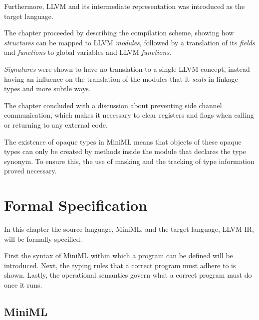\documentclass[10pt,a4paper]{report}
\begin{document}
Furthermore, LLVM and its intermediate representation was introduced as the target language.

The chapter proceeded by describing the compilation scheme, showing how \emph{structures} can be mapped to LLVM \emph{modules}, followed by a translation of its \emph{fields} and \emph{functions} to global variables and LLVM \emph{functions}.

\emph{Signatures} were shown to have no translation to a single LLVM concept, instead having an influence on the translation of the modules that it \emph{seals} in linkage types and more subtle ways.

The chapter concluded with a discussion about preventing side channel communication, which makes it necessary to clear registers and flags when calling or returning to any external code.

The existence of opaque types in \mbox{MiniML} means that objects of these opaque types can only be created by methods inside the module that declares the type synonym. To ensure this, the use of masking and the tracking of type information proved necessary.

\chapter{Formal Specification \label{chapter:formalspecification}}
In this chapter the source language, \mbox{MiniML}, and the target language, LLVM IR, will be formally specified. 

First the syntax of \mbox{MiniML} within which a program can be defined will be introduced. Next, the typing rules that a correct program must adhere to is shown. Lastly, the operational semantics govern what a correct program must do once it runs.
\section{MiniML}
\end{document}
